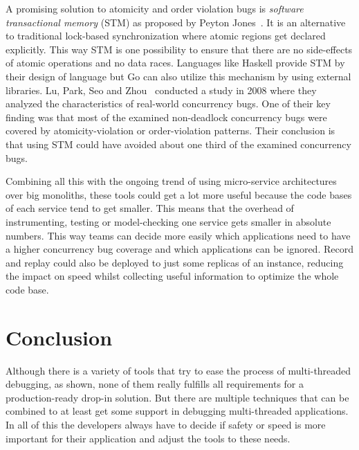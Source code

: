 \documentclass[conference]{IEEEtran}
\begin{document}
A promising solution to atomicity and order violation bugs is \emph{software transactional memory} (STM) as proposed by Peyton Jones~\cite{peytonjones2007beautiful}.
It is an alternative to traditional lock-based synchronization where atomic regions get declared explicitly.
This way STM is one possibility to ensure that there are no side-effects of atomic operations and no data races.
Languages like Haskell provide STM by their design of language but Go can also utilize this mechanism by using external libraries.
Lu, Park, Seo and Zhou~\cite{lu2008mistakes} conducted a study in 2008 where they analyzed the characteristics of real-world concurrency bugs.
One of their key finding was that most of the examined non-deadlock concurrency bugs were covered by atomicity-violation or order-violation patterns.
Their conclusion is that using STM could have avoided about one third of the examined concurrency bugs.

Combining all this with the ongoing trend of using micro-service architectures over big monoliths, these tools could get a lot more useful because the code bases of each service tend to get smaller.
This means that the overhead of instrumenting, testing or model-checking one service gets smaller in absolute numbers.
This way teams can decide more easily which applications need to have a higher concurrency bug coverage and which applications can be ignored.
Record and replay could also be deployed to just some replicas of an instance, reducing the impact on speed whilst collecting useful information to optimize the whole code base.


\section{Conclusion}
\label{sct:conclusion}

Although there is a variety of tools that try to ease the process of multi-threaded debugging, as shown, none of them really fulfills all requirements for a production-ready drop-in solution.
But there are multiple techniques that can be combined to at least get some support in debugging multi-threaded applications.
In all of this the developers always have to decide if safety or speed is more important for their application and adjust the tools to these needs.



\end{document}
